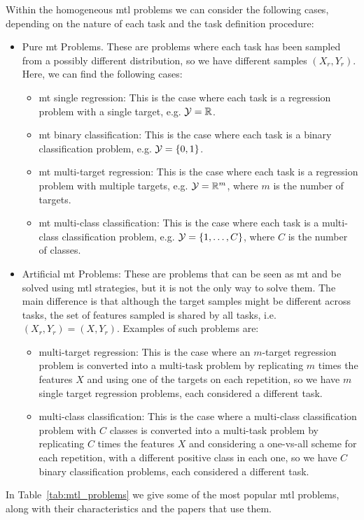 Within the homogeneous \acrshort{mtl} problems we can consider the following cases, depending on the nature of each task and the task definition procedure:
\begin{itemize}
    \item Pure \acrshort{mt} Problems. These are problems where each task has been sampled from a possibly different distribution, so we have different samples $(X_r, Y_r)$. Here, we can find the following cases:
    \begin{itemize}
        \item \acrshort{mt} single regression: This is the case where each task is a regression problem with a single target, e.g. $\mathcal{Y} = \mathbb{R}$. 
        \item \acrshort{mt} binary classification: This is the case where each task is a binary classification problem, e.g. $\mathcal{Y} = \left\{0, 1\right\}$. 
        \item \acrshort{mt} multi-target regression: This is the case where each task is a regression problem with multiple targets, e.g. $\mathcal{Y} = \mathbb{R}^m$, where $m$ is the number of targets. 
        \item \acrshort{mt} multi-class classification: This is the case where each task is a multi-class classification problem, e.g. $\mathcal{Y} = \left\{1, \ldots, C\right\}$, where $C$ is the number of classes.
    \end{itemize}
    \item Artificial \acrshort{mt} Problems: These are problems that can be seen as \acrshort{mt} and be solved using \acrshort{mtl} strategies, but it is not the only way to solve them. The main difference is that although the target samples might be different across tasks, the set of features sampled is shared by all tasks, i.e. $(X_r, Y_r) = (X, Y_r)$. Examples of such problems are:
    \begin{itemize}
        \item multi-target regression: This is the case where an $m$-target regression problem is converted into a multi-task problem by replicating $m$ times the features $X$ and using one of the targets on each repetition, so we have $m$ single target regression problems, each considered a different task.
        \item multi-class classification: This is the case where a multi-class classification problem with $C$ classes is converted into a multi-task problem by replicating $C$ times the features $X$ and considering a one-vs-all scheme for each repetition, with a different positive class in each one, so we have $C$ binary classification problems, each considered a different task.
    \end{itemize}
\end{itemize}
In Table~\ref{tab:mtl_problems} we give some of the most popular \acrshort{mtl} problems, along with their characteristics and the papers that use them.

